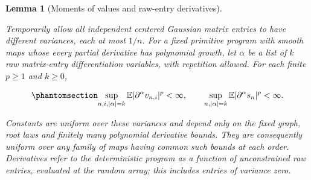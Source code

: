 \documentclass[
  11pt,
]{article}
\theoremstyle{definition}
\theoremstyle{plain}
\theoremstyle{plain}
\theoremstyle{plain}
\newtheorem{lemma}{Lemma}[section]
\theoremstyle{remark}
\begin{document}
\begin{lemma}[Moments of values and raw-entry
derivatives]\protect\hypertarget{lem-mfp-raw-entry-moments}{}\label{lem-mfp-raw-entry-moments}

Temporarily allow all independent centered Gaussian matrix entries to
have different variances, each at most \(1/n\). For a fixed primitive
program with smooth maps whose every partial derivative has polynomial
growth, let \(\alpha\) be a list of \(k\) raw matrix-entry
differentiation variables, with repetition allowed. For each finite
\(p\ge1\) and \(k\ge0\),

\begin{equation}\protect\phantomsection\label{eq-mfp-raw-entry-bounds}{
\sup_{n,i,|\alpha|=k}\mathbb E|\partial^\alpha v_{n,i}|^p<\infty,
\qquad
\sup_{n,|\alpha|=k}\mathbb E|\partial^\alpha s_n|^p<\infty.
}\end{equation}

Constants are uniform over these variances and depend only on the fixed
graph, root laws and finitely many polynomial derivative bounds. They
are consequently uniform over any family of maps having common such
bounds at each order. Derivatives refer to the deterministic program as
a function of unconstrained raw entries, evaluated at the random array;
this includes entries of variance zero.

\end{lemma}

\protect{}\label{proof-mfp-raw-entry-moments}{}
\end{document}
